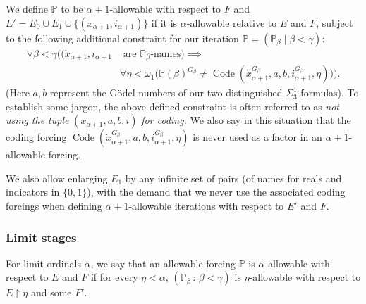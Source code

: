 \documentclass[a4paper,11pt]{article}
\newcommand{\forceP}{\mathbb{P}}
\begin{document}
We define $\mathbb{P}$ to be $\alpha+1$-allowable with respect to $F$ and $E' = E_0 \cup E_1 \cup \{(\dot{x}_{\alpha+1}, i_{\alpha+1})\}$ if it is $\alpha$-allowable relative to $E$ and $F$, subject to the following additional constraint for our iteration $\mathbb{P}=(\mathbb{P}_{\beta} \mid \beta < \gamma)$:
\begin{align*}
    \forall \beta < \gamma \Big( (\dot{x}_{\alpha+1}, i_{\alpha+1} &\text{ are } \mathbb{P}_{\beta}\text{-names}) \implies \\
    & \forall \eta < \omega_1 \big( \mathbb{P}(\beta)^{G_{\beta}} \neq \operatorname{Code}(\dot{x}_{\alpha+1}^{G_{\beta}}, a, b, i_{\alpha+1}^{G_{\beta}}, \eta) \big) \Big).
\end{align*}
(Here $a, b$ represent the G\"odel numbers of our two distinguished $\Sigma^1_3$ formulas).
To establish some jargon, the above defined constraint is often referred to as \emph{not using the tuple} $(x_{\alpha+1},a,b,i)$ \emph{for coding.} We also say in this situation that the coding forcing
$\operatorname{Code}(\dot{x}_{\alpha+1}^{G_{\beta}}, a, b, i_{\alpha+1}^{G_{\beta}}, \eta)$ is never used as a factor in an $\alpha+1$-allowable forcing.

We also allow enlarging $E_1$ by any infinite set of pairs (of names for reals and indicators in $\{0,1\}$), with the demand that we never use the associated coding forcings when defining $\alpha+1$-allowable iterations with respect to $E'$ and $F$.





\subsubsection{Limit stages}

For limit ordinals $\alpha$, we say that an allowable forcing $\forceP$ is $\alpha$ allowable with respect to $E$ and $F$ if for every $\eta < \alpha$,
$(\forceP_{\beta} \,: \, \beta < \gamma)$ is $\eta$-allowable with respect to $E \upharpoonright \eta$ and some $F'$.
\par \medskip
\end{document}
